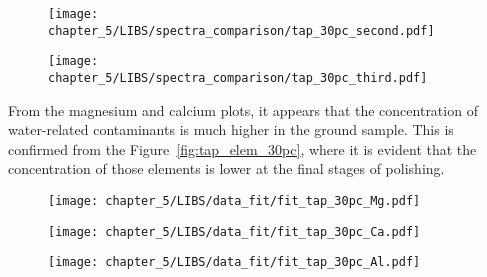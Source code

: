  \vspace*{-68pt}
 \begin{figure}[H]
     \centering
     \texttt{[image: chapter\_5/LIBS/spectra\_comparison/tap\_30pc\_second.pdf]} 
  \end{figure}
 
 \vspace*{-68pt}
 \begin{figure}[H]
     \centering
     \texttt{[image: chapter\_5/LIBS/spectra\_comparison/tap\_30pc\_third.pdf]} 
  \end{figure}
 
From the magnesium and calcium plots, it appears that the concentration of water-related contaminants is much higher in the ground sample. This is confirmed from the Figure~\ref{fig:tap_elem_30pc}, where it is evident that the concentration of those elements is lower at the final stages of polishing.

 \begin{figure}[H]
     \centering
     \texttt{[image: chapter\_5/LIBS/data\_fit/fit\_tap\_30pc\_Mg.pdf]} 
  \end{figure}
 
  \begin{figure}[H]
     \centering
     \texttt{[image: chapter\_5/LIBS/data\_fit/fit\_tap\_30pc\_Ca.pdf]} 
  \end{figure}
     \vspace{-40pt}
  \begin{figure}[H]
     \centering
     \texttt{[image: chapter\_5/LIBS/data\_fit/fit\_tap\_30pc\_Al.pdf]} 
  \end{figure}

